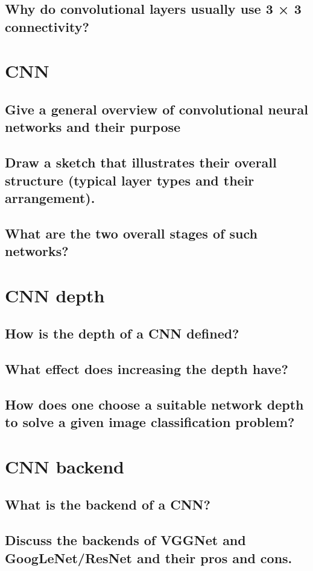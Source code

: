 \subsection{Why do convolutional layers usually use 3 × 3 connectivity?}


\section{CNN}
\subsection{Give a general overview of convolutional neural networks and their purpose}
\subsection{Draw a sketch that illustrates their overall structure (typical layer types and their arrangement).}
\subsection{What are the two overall stages of such networks?}

\section{CNN depth}
\subsection{How is the depth of a CNN defined?}
\subsection{What effect does increasing the depth have?}
\subsection{How does one choose a suitable network depth to solve a given image classification problem?}

\section{CNN backend}
\subsection{What is the backend of a CNN?}
\subsection{Discuss the backends of VGGNet and GoogLeNet/ResNet and their pros and cons.}

